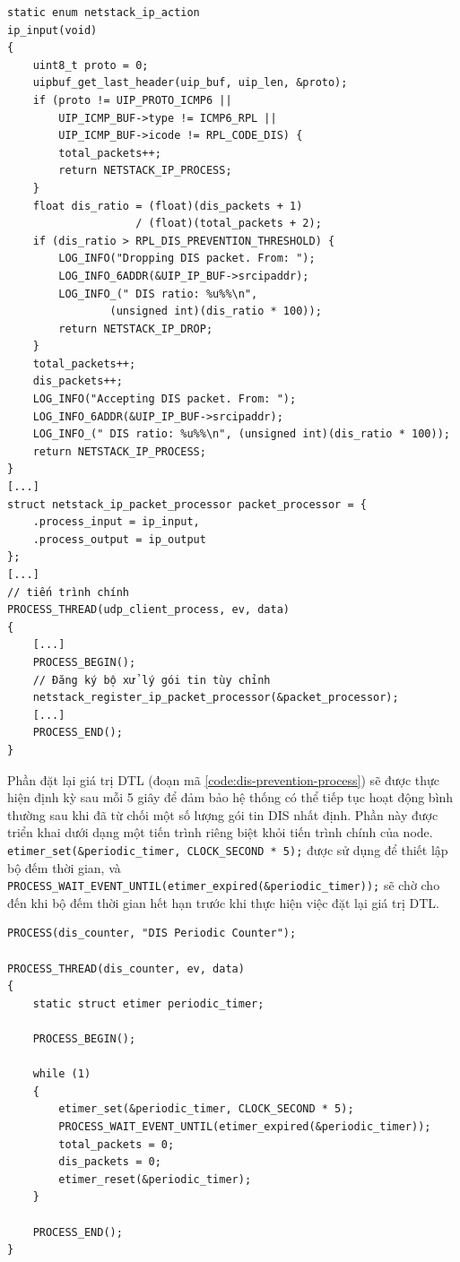\begin{verbatim}
static enum netstack_ip_action
ip_input(void)
{
    uint8_t proto = 0;
    uipbuf_get_last_header(uip_buf, uip_len, &proto);
    if (proto != UIP_PROTO_ICMP6 ||
        UIP_ICMP_BUF->type != ICMP6_RPL ||
        UIP_ICMP_BUF->icode != RPL_CODE_DIS) {
        total_packets++;
        return NETSTACK_IP_PROCESS;
    }
    float dis_ratio = (float)(dis_packets + 1) 
                    / (float)(total_packets + 2);
    if (dis_ratio > RPL_DIS_PREVENTION_THRESHOLD) {
        LOG_INFO("Dropping DIS packet. From: ");
        LOG_INFO_6ADDR(&UIP_IP_BUF->srcipaddr);
        LOG_INFO_(" DIS ratio: %u%%\n", 
                (unsigned int)(dis_ratio * 100));
        return NETSTACK_IP_DROP;
    }
    total_packets++;
    dis_packets++;
    LOG_INFO("Accepting DIS packet. From: ");
    LOG_INFO_6ADDR(&UIP_IP_BUF->srcipaddr);
    LOG_INFO_(" DIS ratio: %u%%\n", (unsigned int)(dis_ratio * 100));
    return NETSTACK_IP_PROCESS;
}
[...]
struct netstack_ip_packet_processor packet_processor = {
    .process_input = ip_input,
    .process_output = ip_output
};
[...]
// tiến trình chính
PROCESS_THREAD(udp_client_process, ev, data)
{
    [...]
    PROCESS_BEGIN();
    // Đăng ký bộ xử lý gói tin tùy chỉnh
    netstack_register_ip_packet_processor(&packet_processor);
    [...]
    PROCESS_END();
}
\end{verbatim}

Phần đặt lại giá trị DTL (đoạn mã \ref{code:dis-prevention-process}) sẽ được thực hiện định kỳ sau mỗi 5 giây để đảm bảo hệ thống có thể tiếp tục hoạt động bình thường sau khi đã từ chối một số lượng gói tin DIS nhất định. Phần này được triển khai dưới dạng một tiến trình riêng biệt khỏi tiến trình chính của node. \texttt{etimer\_set(\&periodic\_timer, CLOCK\_SECOND * 5);} được sử dụng để thiết lập bộ đếm thời gian, và \\
\texttt{PROCESS\_WAIT\_EVENT\_UNTIL(etimer\_expired(\&periodic\_timer));} sẽ chờ cho đến khi bộ đếm thời gian hết hạn trước khi thực hiện việc đặt lại giá trị DTL.

\label{code:dis-prevention-process}
\begin{verbatim}
PROCESS(dis_counter, "DIS Periodic Counter");

PROCESS_THREAD(dis_counter, ev, data)
{
    static struct etimer periodic_timer;

    PROCESS_BEGIN();

    while (1)
    {
        etimer_set(&periodic_timer, CLOCK_SECOND * 5);
        PROCESS_WAIT_EVENT_UNTIL(etimer_expired(&periodic_timer));
        total_packets = 0;
        dis_packets = 0;
        etimer_reset(&periodic_timer);
    }

    PROCESS_END();
}
\end{verbatim}

